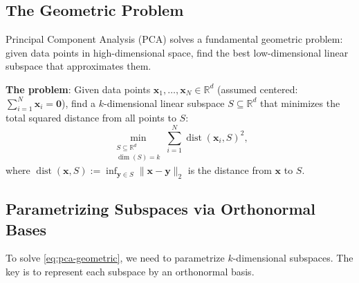 \subsection{The Geometric Problem}

Principal Component Analysis (PCA) solves a fundamental geometric problem: given data points in high-dimensional space, find the best low-dimensional linear subspace that approximates them.

\textbf{The problem}: Given data points $\mathbf{x}_1,\dots,\mathbf{x}_N \in \mathbb{R}^d$ (assumed centered: $\sum_{i=1}^{N}\mathbf{x}_i = \mathbf{0}$), find a $k$-dimensional linear subspace $S \subseteq \mathbb{R}^d$ that minimizes the total squared distance from all points to $S$:
\begin{equation}\label{eq:pca-geometric}
  \min_{\substack{S \subseteq \mathbb{R}^d \\ \dim(S) = k}} \sum_{i=1}^{N} \operatorname{dist}(\mathbf{x}_i, S)^2,
\end{equation}
where $\operatorname{dist}(\mathbf{x}, S) := \inf_{\mathbf{y} \in S} \|\mathbf{x} - \mathbf{y}\|_2$ is the distance from $\mathbf{x}$ to $S$.

\begin{center}
\end{center}

\subsection{Parametrizing Subspaces via Orthonormal Bases}

To solve \eqref{eq:pca-geometric}, we need to parametrize $k$-dimensional subspaces. The key is to represent each subspace by an orthonormal basis.

